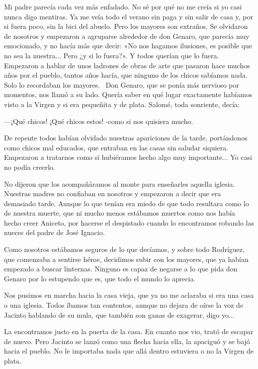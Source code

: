 \documentclass{barcodevapor3pags}
\begin{document}
Mi padre parecía cada vez más enfadado. No sé por qué no me creía si yo
casi nunca digo mentiras. Ya me veía todo el verano sin paga y sin salir
de casa y, por si fuera poco, sin la bici del abuelo. Pero los mayores son extraños. Se olvidaron de nosotros y empezaron a
agruparse alrededor de don Genaro, que parecía muy emocionado, y no
hacía más que decir: «No nos hagamos ilusiones, es posible que no sea la
nuestra... Pero ¿y si lo fuera?». Y todos querían que lo fuera. Empezaron a hablar de unos ladrones de
obras de arte que pasaron hace muchos años por el pueblo, tantos años
hacía, que ninguno de los chicos sabíamos nada. Solo lo recordaban los
mayores.~
Don Genaro, que se ponía más nervioso por momentos, nos llamó a su lado.
Quería saber en qué lugar exactamente habíamos visto a la Virgen y si
era pequeñita y de plata. Salomé, toda sonriente, decía:~

---¡Qué chicos! ¡Qué chicos estos! -como si nos quisiera mucho.~

De repente todos habían olvidado nuestras apariciones de la tarde,
portándonos como chicos mal educados, que entraban en las casas sin
saludar siquiera. Empezaron a tratarnos como si hubiéramos hecho algo
muy importante... Yo casi no podía creerlo.~

No dijeron que los acompañáramos al monte para enseñarles aquella
iglesia. Nuestras madres no confiaban en nosotros y empezaron a decir
que era demasiado tarde. Aunque lo que tenían era miedo de que todo
resultara como lo de nuestra muerte, que ni mucho menos estábamos
muertos como nos había hecho creer Aniceto, por hacerse el despistado
cuando lo encontramos robando las nueces del padre de José Ignacio.~

Como nosotros estábamos seguros de lo que decíamos, y sobre todo
Rodríguez, que comenzaba a sentirse héroe, decidimos subir con los
mayores, que ya habían empezado a buscar linternas. Ninguno es capaz de
negarse a lo que pida don Genaro por lo estupendo que es, que todo el
mundo lo aprecia.~

Nos pusimos en marcha hacia la casa vieja, que ya no me aclaraba si era
una casa o una iglesia. Todos íbamos tan contentos, aunque no dejara de
oírse la voz de Jacinto hablando de su mula, que también son ganas de
exagerar, digo yo...~

La encontramos justo en la puerta de la casa. En cuanto nos vio, trató
de escapar de nuevo. Pero Jacinto se lanzó como una flecha hacia ella,
la apaciguó y se bajó hacia el pueblo. No le importaba nada que allá
dentro estuviera o no la Virgen de plata.~
\end{document}
